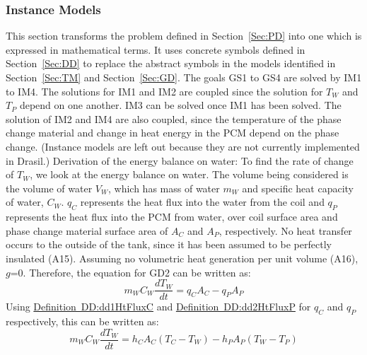 \documentclass[12pt]{article}
\begin{document}
\subsubsection{Instance Models}
\label{Sec:IM}
This section transforms the problem defined in Section~\ref{Sec:PD} into one which is expressed in mathematical terms. It uses concrete symbols defined in Section~\ref{Sec:DD} to replace the abstract symbols in the models identified in Section~\ref{Sec:TM} and Section~\ref{Sec:GD}.
The goals GS1 to GS4 are solved by IM1 to IM4. The solutions for IM1 and IM2 are coupled since the solution for $T_{W}$ and $T_{P}$ depend on one another. IM3 can be solved once IM1 has been solved. The solution of IM2 and IM4 are also coupled, since the temperature of the phase change material and change in heat energy in the PCM depend on the phase change. (Instance models are left out because they are not currently implemented in Drasil.)
Derivation of the energy balance on water:
To find the rate of change of $T_{W}$, we look at the energy balance on water. The volume being considered is the volume of water $V_{W}$, which has mass of water $m_{W}$ and specific heat capacity of water, $C_{W}$. $q_{C}$ represents the heat flux into the water from the coil and $q_{P}$ represents the heat flux into the PCM from water, over coil surface area and phase change material surface area of $A_{C}$ and $A_{P}$, respectively. No heat transfer occurs to the outside of the tank, since it has been assumed to be perfectly insulated (A15). Assuming no volumetric heat generation per unit volume (A16), $g$=0. Therefore, the equation for GD2 can be written as:
\begin{equation}
m_{W}C_{W}\frac{dT_{W}}{dt}=q_{C}A_{C}-q_{P}A_{P}
\end{equation}
Using \hyperref[DD:dd1HtFluxC]{Definition~DD:dd1HtFluxC} and \hyperref[DD:dd2HtFluxP]{Definition~DD:dd2HtFluxP} for $q_{C}$ and $q_{P}$ respectively, this can be written as:
\begin{equation}
m_{W}C_{W}\frac{dT_{W}}{dt}=h_{C}A_{C}(T_{C}-T_{W})-h_{P}A_{P}(T_{W}-T_{P})
\end{equation}
\end{document}
